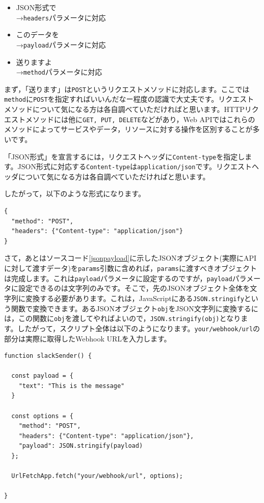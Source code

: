 \documentclass[uplatex,a4j]{jsarticle}
\begin{document}
\begin{itemize}
\item JSON形式で\\
→\verb|headers|パラメータに対応
\item このデータを\\
→\verb|payload|パラメータに対応
\item 送りますよ\\
→\verb|method|パラメータに対応
\end{itemize}


まず，「送ります」は\verb|POST|というリクエストメソッドに対応します。ここでは\verb|method|に\verb|POST|を指定すればいいんだなー程度の認識で大丈夫です。リクエストメソッドについて気になる方は各自調べていただければと思います。HTTPリクエストメソッドには他に\verb|GET, PUT, DELETE|などがあり，Web APIではこれらのメソッドによってサービスやデータ，リソースに対する操作を区別することが多いです。


「JSON形式」を宣言するには，リクエストヘッダに\verb|Content-type|を指定します。JSON形式に対応する\verb|Content-type|は\verb|application/json|です。リクエストヘッダについて気になる方は各自調べていただければと思います。


したがって，以下のような形式になります。

\begin{lstlisting}[basicstyle=\ttfamily\footnotesize,frame=single,caption=params argument for UrlFetchApp]
{
  "method": "POST",
  "headers": {"Content-type": "application/json"}
}
\end{lstlisting}

さて，あとはソースコード\ref{jsonpayload}に示したJSONオブジェクト(実際にAPIに対して渡すデータ)を\verb|params|引数に含めれば，\verb|params|に渡すべきオブジェクトは完成します。これは\verb|payload|パラメータに設定するのですが，\verb|payload|パラメータに設定できるのは文字列のみです。そこで，先のJSONオブジェクト全体を文字列に変換する必要があります。これは，JavaScriptにある\verb|JSON.stringify|という関数で変換できます。あるJSONオブジェクト\verb|obj|をJSON文字列に変換するには，この関数に\verb|obj|を渡してやればよいので，\verb|JSON.stringify(obj)|となります。したがって，スクリプト全体は以下のようになります。\verb|your/webhook/url|の部分は実際に取得したWebhook URLを入力します。

\begin{lstlisting}[basicstyle=\ttfamily\footnotesize,frame=single,caption=Incoming Webhook Sample]
function slackSender() {
  
  const payload = {
    "text": "This is the message"
  }
  
  const options = {
    "method": "POST",
    "headers": {"Content-type": "application/json"},
    "payload": JSON.stringify(payload)
  };
        
  UrlFetchApp.fetch("your/webhook/url", options);
  
}
\end{lstlisting}
\end{document}
